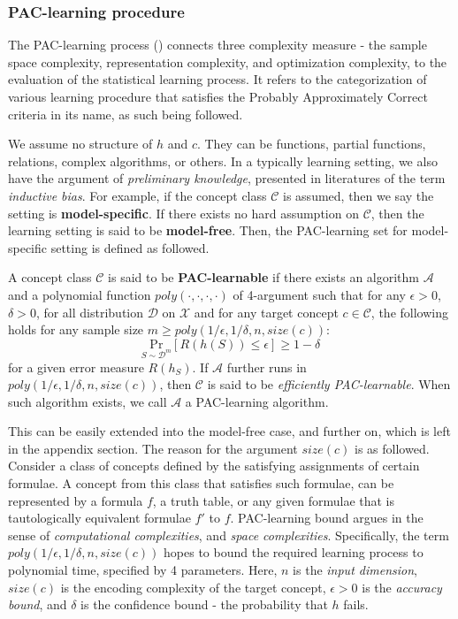 \documentclass[10pt,oneside,oldfontcommands,dvipsnames,article]{memoir}
\begin{document}
\subsubsection{PAC-learning procedure}

The PAC-learning process (\cite{10.5555/2621980,10.5555/2371238,STL_Hajek_Maxim_2021}) connects three complexity measure - the sample space complexity, representation complexity, and optimization complexity, to the evaluation of the statistical learning process. It refers to the categorization of various learning procedure that satisfies the Probably Approximately Correct criteria in its name, as such being followed. 

We assume no structure of $h$ and $c$. They can be functions, partial functions, relations, complex algorithms, or others. In a typically learning setting, we also have the argument of \textit{preliminary knowledge}, presented in literatures of the term \textit{inductive bias}. For example, if the concept class $\mathcal{C}$ is assumed, then we say the setting is \textbf{model-specific}. If there exists no hard assumption on $\mathcal{C}$, then the learning setting is said to be \textbf{model-free}. Then, the PAC-learning set for model-specific setting is defined as followed. 

\begin{definition}
    A concept class $\mathcal{C}$ is said to be \textbf{PAC-learnable} if there exists an algorithm $\mathcal{A}$ and a polynomial function $poly(\cdot,\cdot,\cdot,\cdot)$ of 4-argument such that for any $\epsilon>0$, $\delta>0$, for all distribution $\mathcal{D}$ on $\mathcal{X}$ and for any target concept $c\in\mathcal{C}$, the following holds for any sample size $m\geq poly(1/\epsilon,1/\delta,n,size(c))$: $$\underset{S\sim \mathcal{D}^{m}}{\mathrm{Pr}}\left[ R(h(S))\leq \epsilon \right]\geq 1-\delta$$
    for a given error measure $R(h_{S})$. If $\mathcal{A}$ further runs in $poly(1/\epsilon,1/\delta,n,size(c))$, then $\mathcal{C}$ is said to be \textit{efficiently PAC-learnable}. When such algorithm exists, we call $\mathcal{A}$ a PAC-learning algorithm. 
\end{definition}
This can be easily extended into the model-free case, and further on, which is left in the appendix section. The reason for the argument $size(c)$ is as followed. Consider a class of concepts defined by the satisfying assignments of certain formulae. A concept from this class that satisfies such formulae, can be represented by a formula $f$, a truth table, or any given formulae that is tautologically equivalent formulae $f'$ to $f$. PAC-learning bound argues in the sense of \textit{computational complexities}, and \textit{space complexities}. Specifically, the term $poly(1/\epsilon,1/\delta,n,size(c))$ hopes to bound the required learning process to polynomial time, specified by 4 parameters. Here, $n$ is the \textit{input dimension}, $size(c)$ is the encoding complexity of the target concept, $\epsilon>0$ is the \textit{accuracy bound}, and $\delta$ is the confidence bound - the probability that $h$ fails.
\end{document}
